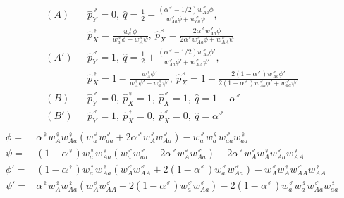 \documentclass[12pt]{article}
\begin{document}
\begin{equation*}
\begin{split}
(A)\ \ \ &\hat{p}_{Y}^{\male}=0,
\ \hat{q}=\frac{1}{2}-\frac{(\alpha^{\male}-1/2)w_{Aa}^{\male} \phi}{w_{Aa}^{\male} \phi+ w_{aa}^{\male} \psi},\\
&\hat{p}_{X}^{\female}=\frac{w_{a}^{\female} \phi}{w_{a}^{\female} \phi+ w_{A}^{\female} \psi},
\ \hat{p}_{X}^{\male}=\frac{2 \alpha^{\male}w_{Aa}^{\male} \phi}{2\alpha^{\male}w_{Aa}^{\male} \phi +w_{AA}^{\male} \psi}\\
(A')\ \ \ &\hat{p}_{Y}^{\male}=1,
\ \hat{q}=\frac{1}{2}+\frac{(\alpha^{\male}-1/2)w_{Aa}^{\male} \phi'}{w_{Aa}^{\male} \phi' + w_{AA}^{\male} \psi'},\\
&\hat{p}_{X}^{\female}=1-\frac{w_{A}^{\female} \phi'}{w_{A}^{\female} \phi'+ w_{a}^{\female} \psi'},
\ \hat{p}_{X}^{\male}=1-\frac{2(1-\alpha^{\male})w_{Aa}^{\male} \phi'}{2(1-\alpha^{\male})w_{Aa}^{\male} \phi'+w_{aa}^{\male} \psi'}\\
(B)\ \ \ &\hat{p}_{Y}^{\male}=0,\ \hat{p}_{X}^{\female}=1,\ \hat{p}_{X}^{\male}=1, \ \hat{q}=1-\alpha^{\male}\\
(B')\ \ \ &\hat{p}_{Y}^{\male}=1,\ \hat{p}_{X}^{\female}=0,\ \hat{p}_{X}^{\male}=0, \ \hat{q}=\alpha^{\male}\\
\end{split}
\end{equation*}
\begin{equation*}
\begin{split}
\phi=&\alpha^{\female} w_{A}^{\female} w_{Aa}^{\female}(w_{a}^{\male} w_{aa}^{\male} + 2 \alpha^{\male} w_{A}^{\male} w_{Aa}^{\male}) - w_{a}^{\male} w_{a}^{\female} w_{aa}^{\male} w_{aa}^{\female} \\
\psi=&(1-\alpha^{\female}) w_{a}^{\female} w_{Aa}^{\female}(w_{a}^{\male} w_{aa}^{\male} + 2 \alpha^{\male} w_{A}^{\male} w_{Aa}^{\male}) - 2\alpha^{\male} w_{A}^{\male} w_{A}^{\female} w_{Aa}^{\male} w_{AA}^{\female}\\
\phi'=&(1-\alpha^{\female}) w_{a}^{\female} w_{Aa}^{\female}(w_{A}^{\male} w_{AA}^{\male} + 2 (1-\alpha^{\male}) w_{a}^{\male} w_{Aa}^{\male}) - w_{A}^{\male} w_{A}^{\female} w_{AA}^{\male} w_{AA}^{\female}\\
\psi'=&\alpha^{\female} w_{A}^{\female} w_{Aa}^{\female}(w_{A}^{\male} w_{AA}^{\male} + 2 (1-\alpha^{\male}) w_{a}^{\male} w_{Aa}^{\male}) - 2(1-\alpha^{\male}) w_{a}^{\male} w_{a}^{\female} w_{Aa}^{\male} w_{aa}^{\female}\\
\end{split}
\end{equation*}
\end{document}
